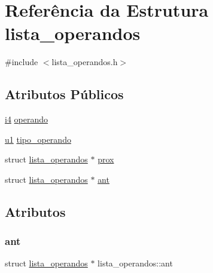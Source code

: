 \hypertarget{structlista__operandos}{}\section{Referência da Estrutura lista\+\_\+operandos}
\label{structlista__operandos}


{\ttfamily \#include $<$lista\+\_\+operandos.\+h$>$}

\subsection*{Atributos Públicos}
\begin{DoxyCompactItemize}
\item 
\hyperlink{lista__operandos_8h_a7bc084923d20fddbe46335d882c6fda2}{i4} \hyperlink{structlista__operandos_ab978dbacb8f42fd87f19cca8e804d121}{operando}
\item 
\hyperlink{lista__operandos_8h_ad9f4cdb6757615aae2fad89dab3c5470}{u1} \hyperlink{structlista__operandos_af64bc84846f21a809f68b783f0e39f40}{tipo\+\_\+operando}
\item 
struct \hyperlink{structlista__operandos}{lista\+\_\+operandos} $\ast$ \hyperlink{structlista__operandos_a90699e5c7f710177b37754cd5231c9f5}{prox}
\item 
struct \hyperlink{structlista__operandos}{lista\+\_\+operandos} $\ast$ \hyperlink{structlista__operandos_abe9d6cbd0d571fc22564a95b17a98123}{ant}
\end{DoxyCompactItemize}


\subsection{Atributos}
\mbox{\label{structlista__operandos_abe9d6cbd0d571fc22564a95b17a98123}} 
\subsubsection{\texorpdfstring{ant}{ant}}
{\footnotesize\ttfamily struct \hyperlink{structlista__operandos}{lista\+\_\+operandos} $\ast$ lista\+\_\+operandos\+::ant}

\mbox{\label{structlista__operandos_ab978dbacb8f42fd87f19cca8e804d121}} 
